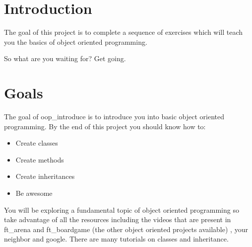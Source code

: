\documentclass{42-en}
\begin{document}
\chapter{Introduction}

	The goal of this project is to complete a sequence of exercises which will
	teach you the basics of object oriented programming.\\


	So what are you waiting for? Get going.\\


\chapter{Goals}

	The goal of oop\_introduce is to introduce you into basic object oriented programming.
	By the end of this project you should know how to:\\
	
	\begin{itemize}
		\item Create classes
		\item Create methods
		\item Create inheritances
		\item Be awesome
	\end{itemize}
	 
	You will be exploring a fundamental topic of object oriented programming
	so take advantage of all the resources including the videos that are present
	in ft\_arena and ft\_boardgame (the other object oriented projects available)
	, your neighbor and google. There are many tutorials on classes and inheritance.
\end{document}

